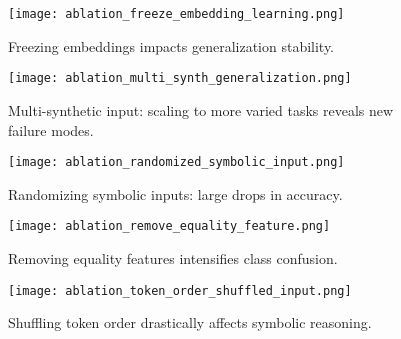 \documentclass{article}
\begin{document}
\begin{figure}[h]
    \centering
    \texttt{[image: ablation\_freeze\_embedding\_learning.png]}
    \caption{Freezing embeddings impacts generalization stability.}
    \label{fig:freeze-embed}
\end{figure}
\begin{figure}[h]
    \centering
    \texttt{[image: ablation\_multi\_synth\_generalization.png]}
    \caption{Multi-synthetic input: scaling to more varied tasks reveals new failure modes.}
    \label{fig:multi-synth}
\end{figure}
\begin{figure}[h]
    \centering
    \texttt{[image: ablation\_randomized\_symbolic\_input.png]}
    \caption{Randomizing symbolic inputs: large drops in accuracy.}
    \label{fig:random-sym}
\end{figure}
\begin{figure}[h]
    \centering
    \texttt{[image: ablation\_remove\_equality\_feature.png]}
    \caption{Removing equality features intensifies class confusion.}
    \label{fig:remove-equal}
\end{figure}
\begin{figure}[h]
    \centering
    \texttt{[image: ablation\_token\_order\_shuffled\_input.png]}
    \caption{Shuffling token order drastically affects symbolic reasoning.}
    \label{fig:shuffle-input}
\end{figure}
\end{document}
